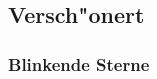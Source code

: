 %



\newpage



\subsection{Versch{"o}nert} %
\label{Abschnitt:Aenderungen:Protokoll:Verschoenerungen}


\subsubsection*{Blinkende Sterne}









